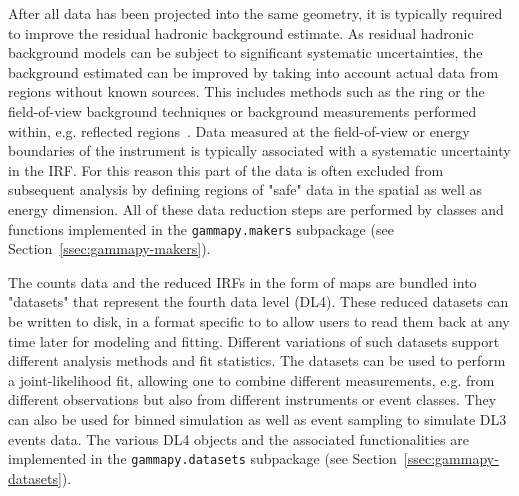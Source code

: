 \documentclass[traditabstract, longauth]{aa}
\newcommand{\code}[1]{\texttt{#1}}
\begin{document}
After all data has been projected into the same geometry, it is typically
required to improve the residual hadronic background estimate. As residual hadronic
background models can be subject to significant systematic uncertainties,
the background estimated can be improved by taking into account actual data
from regions without known \gammaray sources. This includes methods 
such as the ring or the field-of-view background techniques or
background measurements performed within, e.g. reflected regions~\citep{Berge07}.
Data measured at the field-of-view or energy boundaries of the instrument is typically
associated with a systematic uncertainty in the IRF. For this reason this part 
of the data is often excluded from subsequent analysis by defining regions of
 "safe" data in the spatial as well as energy dimension.
All of these data reduction steps are performed by classes and functions
implemented in the \code{gammapy.makers} subpackage (see Section~\ref{ssec:gammapy-makers}).

The counts data and the reduced IRFs in the form of maps are bundled into "datasets"
that represent the fourth data level (DL4). These reduced datasets can be written to disk,
in a format specific to \gammapy to allow users to read them back at any time later
for modeling and fitting. Different variations of such datasets support different 
analysis methods and fit statistics. The datasets can be used to perform a joint-likelihood
fit, allowing one to combine different measurements, e.g. from different observations
but also from different instruments or event classes. They can also be used for binned
simulation as well as event sampling to simulate DL3 events data.
The various DL4 objects and the associated functionalities are
implemented in the \code{gammapy.datasets} subpackage (see Section~\ref{ssec:gammapy-datasets}).
\end{document}
